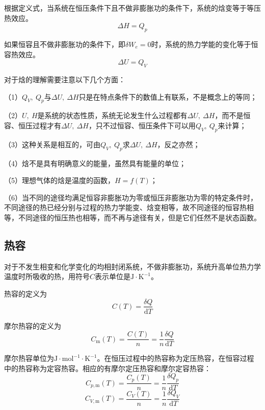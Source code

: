 \documentclass[lang=cn,newtx,11pt,scheme=chinese]{elegantbook}
\begin{document}
根据定义式，当系统在恒压条件下且不做非膨胀功的条件下，系统的焓变等于等压热效应。
\begin{equation}
	\Delta H = Q_p
\end{equation}

如果恒容且不做非膨胀功的条件下，即$\delta W_e =0$时，系统的热力学能的变化等于恒容热效应。
\begin{equation}
	\Delta U = Q_V
\end{equation}

对于焓的理解需要注意以下几个方面：

（1）$Q_V, \ Q_p$与$\Delta U, \ \Delta H$只是在特点条件下的数值上有联系，不是概念上的等同；

（2）$U, \ H$是系统的状态性质，系统无论发生什么过程都有$\Delta U, \ \Delta H$，而不是恒容、恒压过程才有$\Delta U, \ \Delta H$，只不过恒容、恒压条件下可以用$Q_V, \ Q_p$来计算；

（3）这种关系是相互的，可由$Q_V, \ Q_p$求$\Delta U, \ \Delta H$，反之亦然；

（4）焓不是具有明确意义的能量，虽然具有能量的单位；

（5）理想气体的焓是温度的函数，$H=f(T)$；

（6）当不同的途径均满足恒容非膨胀功为零或恒压非膨胀功为零的特定条件时，不同途径的热已经分别与过程的热力学能变、焓变相等，故不同途径的恒容热相等，不同途径的恒压热也相等，而不再与途径有关，但是它们任然不是状态函数。

\subsection{热容}

对于不发生相变和化学变化的均相封闭系统，不做非膨胀功，系统升高单位热力学温度时所吸收的热，用符号$C$表示单位是$\mathrm{J \cdot K^{-1}}$。

热容的定义为
\begin{equation}
	C(T)=\frac{\delta Q}{\mathrm{d}T}
\end{equation}

摩尔热容的定义为
\begin{equation}
	C_{\mathrm{m}}(T)=\frac{C(T)}{n}=\frac{1}{n}\frac{\delta Q}{\mathrm{d}T}
\end{equation}

摩尔热容单位为$\mathrm{J \cdot mol^{-1} \cdot K^{-1}}$。在恒压过程中的热容称为定压热容，在恒容过程中的热容称为定容热容。相应的有摩尔定压热容和摩尔定容热容：
\begin{equation}
	C_{p,\mathrm{m}}(T)=\frac{C_p(T)}{n}=\frac{1}{n}\frac{\delta Q_p}{\mathrm{d}T}
\end{equation}
\begin{equation}
	C_{V,\mathrm{m}}(T)=\frac{C_V(T)}{n}=\frac{1}{n}\frac{\delta Q_V}{\mathrm{d}T}
\end{equation}
\end{document}
